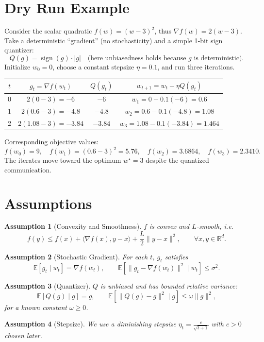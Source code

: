 \documentclass{article}
\newtheorem{assumption}{Assumption}
\newcommand{\EE}{\mathbb{E}}
\newcommand{\RR}{\mathbb{R}}
\begin{document}
\section*{Dry Run Example}
Consider the scalar quadratic $f(w)=(w-3)^2$, thus $\nabla f(w)=2(w-3)$.  
Take a deterministic ``gradient'' (no stochasticity) and a simple 1‑bit sign quantizer:
\[
Q(g)=\operatorname{sign}(g)\cdot|g| \quad\text{(here unbiasedness holds because $g$ is deterministic)}.
\]
Initialize $w_0=0$, choose a constant stepsize $\eta=0.1$, and run three iterations.

\begin{center}
\begin{tabular}{c|c|c|c}
$t$ & $g_t= \nabla f(w_t)$ & $Q(g_t)$ & $w_{t+1}=w_t-\eta Q(g_t)$ \\ \hline
0 & $2(0-3)=-6$ & $-6$ & $w_1=0-0.1(-6)=0.6$ \\ 
1 & $2(0.6-3)=-4.8$ & $-4.8$ & $w_2=0.6-0.1(-4.8)=1.08$ \\ 
2 & $2(1.08-3)=-3.84$ & $-3.84$ & $w_3=1.08-0.1(-3.84)=1.464$ 
\end{tabular}
\end{center}
Corresponding objective values:
\[
f(w_0)=9,\quad f(w_1)=(0.6-3)^2=5.76,\quad f(w_2)=3.6864,\quad f(w_3)=2.3410 .
\]
The iterates move toward the optimum $w^\star=3$ despite the quantized communication.

\newpage

\section*{Assumptions}
\begin{assumption}[Convexity and Smoothness]\label{as:convex}
$f$ is convex and $L$‑smooth, i.e.
\[
f(y)\le f(x)+\langle\nabla f(x),y-x\rangle+\frac{L}{2}\|y-x\|^2,\qquad\forall x,y\in\RR^{d}.
\]
\end{assumption}
\begin{assumption}[Stochastic Gradient]\label{as:sgd}
For each $t$, $g_t$ satisfies
\[
\EE[g_t\mid w_t]=\nabla f(w_t),\qquad 
\EE[\|g_t-\nabla f(w_t)\|^2\mid w_t]\le\sigma^2 .
\]
\end{assumption}
\begin{assumption}[Quantizer]\label{as:quant}
$Q$ is unbiased and has bounded relative variance:
\[
\EE[Q(g)\mid g]=g,\qquad 
\EE[\|Q(g)-g\|^2\mid g]\le\omega\|g\|^2,
\]
for a known constant $\omega\ge0$.
\end{assumption}
\begin{assumption}[Stepsize]\label{as:stepsize}
We use a diminishing stepsize $\eta_t=\frac{c}{\sqrt{t+1}}$ with $c>0$ chosen later.
\end{assumption}
\end{document}
